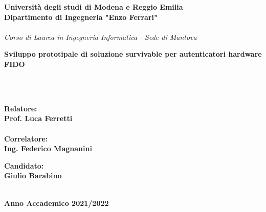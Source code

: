 \documentclass[12pt,a4paper,oneside,onecolumn,openright]{book}
\begin{document}
\begin{titlepage}
\begin{center}
{
    \large
    \textbf{Università  degli studi di Modena e Reggio Emilia} \\
   	\textbf{Dipartimento di Ingegneria "Enzo Ferrari"} \\
    \hspace*{0cm} \hrulefill \hspace*{0cm} \\
   	\emph{Corso di Laurea in Ingegneria Informatica - Sede di Mantova}
    
  
  
 		\huge{\bf Sviluppo prototipale di soluzione survivable per autenticatori hardware FIDO }}\\
		\vspace{3mm}\
		
		\end{center}
		
\vspace{40mm}
\par
\noindent
\begin{minipage}[t]{0.47\textwidth}
{\large{\bf Relatore:\\
Prof. Luca Ferretti}}\\ 
\\
{\large{\bf Correlatore:\\
Ing. Federico Magnanini}}
\end{minipage}
\hfill
\begin{minipage}[t]{0.47\textwidth}\raggedleft
{\large{\bf Candidato:\\
Giulio Barabino}}
\end{minipage}
\vspace{20mm}
\begin{center}
\hspace*{0cm} \hrulefill \hspace*{0cm} \\
{\large{\bf 
Anno Accademico 2021/2022}}
\end{center}

\end{titlepage}

\pagestyle{frontmatter}
\frontmatter

\setcounter{tocdepth}{2}
\tableofcontents
\end{document}
